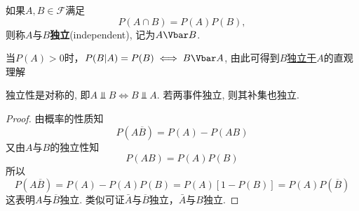 \begin{definition}[事件的独立性]
    如果$A,B\in\mathscr{F}$满足
    \[ P(A\cap B) = P(A)P(B), \]
    则称$A$与$B$\textbf{独立}(independent), 记为$A \indep B$.
\end{definition}
\begin{note}
    当$P(A)>0$时，$P(B|A) = P(B) \iff B \indep A$, 由此可得到\underline{$B$独立于$A$}的直观理解
\end{note}

\begin{property}
    独立性是对称的, 即$A \Vbar B \iff B \Vbar A$. 若两事件独立, 则其补集也独立.
    \begin{center}
    \end{center}
\end{property}
\begin{proof}
    由概率的性质知
    \[ P(A \overline{B}) = P(A) - P(AB) \]
    又由$A$与$B$的独立性知
    \[ P(AB) = P(A)P(B) \]
    所以
    \[ P(A \overline{B}) = P(A) - P(A)P(B) = P(A) [1 - P(B)] = P(A)P( \overline{B}) \]
    这表明$A$与$\overline{B}$独立. 类似可证$\bar A$与$\overline{B}$独立，$\bar A$与$B$独立.
\end{proof}

